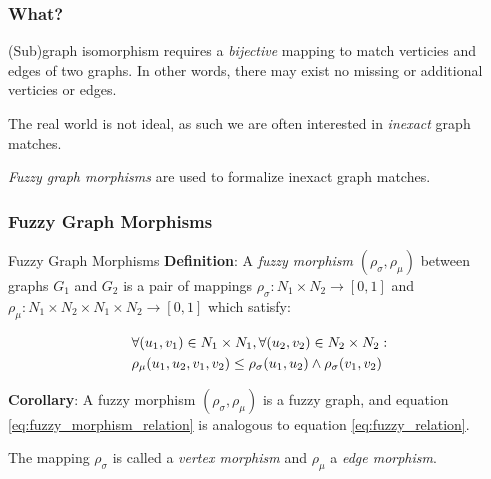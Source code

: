 



\begin{frame}
	\frametitle{What?}

	(Sub)graph isomorphism requires a \textit{bijective} mapping to match verticies and edges of two graphs. In other words, there may exist no missing or additional verticies or edges.

	\vspace*{2em}

	The real world is not ideal, as such we are often interested in \textit{inexact} graph matches.

	\vspace*{2em}

	\textit{Fuzzy graph morphisms} are used to formalize inexact graph matches.
\end{frame}

\begin{frame}
	\frametitle{Fuzzy Graph Morphisms}

	\begin{block}{Fuzzy Graph Morphisms}
		\textbf{Definition}: A \textit{fuzzy morphism} $(\rho_{\sigma}, \rho_{\mu})$ between graphs $G_1$ and $G_2$ is a pair of mappings $\rho_{\sigma}: N_1 \times N_2 \rightarrow [0, 1]$ and $\rho_{\mu}: N_1 \times N_2 \times N_1 \times N_2 \rightarrow [0, 1]$ which satisfy:

		\begin{equation}
			\begin{aligned}
				& \forall (u_1, v_1) \in N_1 \times N_1, \forall (u_2, v_2) \in N_2 \times N_2: \\
				& \rho_{\mu}(u_1, u_2, v_1, v_2) \le \rho_{\sigma}(u_1, u_2) \land \rho_{\sigma}(v_1, v_2)
			\end{aligned}
			\label{eq:fuzzy_morphism_relation}
		\end{equation}

		\textbf{Corollary}: A fuzzy morphism $(\rho_{\sigma}, \rho_{\mu})$ is a fuzzy graph, and equation \ref{eq:fuzzy_morphism_relation} is analogous to equation \ref{eq:fuzzy_relation}.

		\vspace*{2em}

		The mapping $\rho_{\sigma}$ is called a \textit{vertex morphism} and $\rho_{\mu}$ a \textit{edge morphism}.
	\end{block}
\end{frame}

